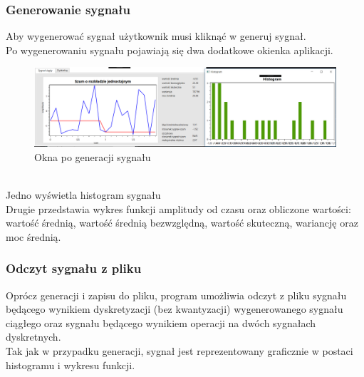 \documentclass[12pt]{article}
\begin{document}
\subsubsection{Generowanie sygnału}
Aby wygenerować sygnał użytkownik musi kliknąć w generuj sygnał.
\\Po wygenerowaniu sygnału pojawiają się dwa dodatkowe okienka aplikacji.
\begin{figure}[h!]
 \centering
 \includegraphics[width=15.3cm]{okienka.PNG}
 \vspace{-0.3cm}
 \caption{Okna po generacji sygnału}
 \label{Widok_aplikacjis}
\end{figure}
\\Jedno wyświetla histogram sygnału
\\Drugie przedstawia wykres funkcji amplitudy od czasu oraz obliczone wartości: wartość średnią, wartość średnią bezwzględną, wartość skuteczną, wariancję oraz moc średnią.

\subsubsection{Odczyt sygnału z pliku}
Oprócz generacji i zapisu do pliku, program umożliwia odczyt z pliku sygnału będącego wynikiem dyskretyzacji (bez kwantyzacji) wygenerowanego
sygnału ciągłego oraz sygnału będącego wynikiem operacji na dwóch sygnałach dyskretnych.
\\Tak jak w przypadku generacji, sygnał jest  reprezentowany graficznie w postaci histogramu i wykresu funkcji.
\end{document}

